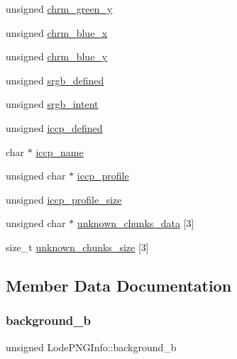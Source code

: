 \begin{DoxyCompactItemize}
\item 
unsigned \mbox{\hyperlink{struct_lode_p_n_g_info_adecaa88e64ed563ad05acd66a36d9a55}{chrm\+\_\+green\+\_\+y}}
\item 
unsigned \mbox{\hyperlink{struct_lode_p_n_g_info_a7394fc7407c168180b2cf64896fbe7fc}{chrm\+\_\+blue\+\_\+x}}
\item 
unsigned \mbox{\hyperlink{struct_lode_p_n_g_info_a9e6af4de8972b039ecb137fb32167505}{chrm\+\_\+blue\+\_\+y}}
\item 
unsigned \mbox{\hyperlink{struct_lode_p_n_g_info_a3a0795a8ec1ddcaac245ba3337054e46}{srgb\+\_\+defined}}
\item 
unsigned \mbox{\hyperlink{struct_lode_p_n_g_info_a35a37c55a3b6c5ff3d064dd26531c72b}{srgb\+\_\+intent}}
\item 
unsigned \mbox{\hyperlink{struct_lode_p_n_g_info_a6304883960715cbcebf45a05c40d5b53}{iccp\+\_\+defined}}
\item 
char $\ast$ \mbox{\hyperlink{struct_lode_p_n_g_info_a0e139ec8c88c920bedb602090a3546d0}{iccp\+\_\+name}}
\item 
unsigned char $\ast$ \mbox{\hyperlink{struct_lode_p_n_g_info_a4400b67420e9c225881901bb48eda9b2}{iccp\+\_\+profile}}
\item 
unsigned \mbox{\hyperlink{struct_lode_p_n_g_info_a11eaae6ecbb308ac1e70dcd10fee6891}{iccp\+\_\+profile\+\_\+size}}
\item 
unsigned char $\ast$ \mbox{\hyperlink{struct_lode_p_n_g_info_a8347476da7fc2fc6af4ec7ed44b638c6}{unknown\+\_\+chunks\+\_\+data}} \mbox{[}3\mbox{]}
\item 
size\+\_\+t \mbox{\hyperlink{struct_lode_p_n_g_info_a25a81d760759bd0383ae5a81ba83911d}{unknown\+\_\+chunks\+\_\+size}} \mbox{[}3\mbox{]}
\end{DoxyCompactItemize}


\subsection{Member Data Documentation}
\mbox{\label{struct_lode_p_n_g_info_a994de0c74ef1092f056ff534e00dfa0d}} 
\subsubsection{\texorpdfstring{background\_b}{background\_b}}
{\footnotesize\ttfamily unsigned Lode\+P\+N\+G\+Info\+::background\+\_\+b}


